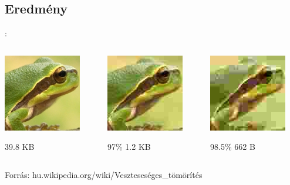 \documentclass{beamer}
\begin{document}
\subsection{Eredmény}
\begin{frame}{\secname: \subsecname}
\centering
\begin{columns}

\begin{column}{0.3\textwidth}
    \includegraphics[scale=0.6]{figures/Hyla_arborea_hun_100.jpg}

    39.8 KB
\end{column}

\begin{column}{0.3\textwidth}
    \includegraphics[scale=0.6]{figures/Hyla_arborea_hun_15.jpg}

    97\% 1.2 KB
\end{column}

\begin{column}{0.3\textwidth}
    \includegraphics[scale=0.6]{figures/Hyla_arborea_hun_5.jpg}

    98.5\% 662 B
\end{column}
\end{columns}

\begin{scriptsize}
Forrás: hu.wikipedia.org/wiki/Veszteseséges\_tömörítés
\end{scriptsize}

\end{frame}
\end{document}
